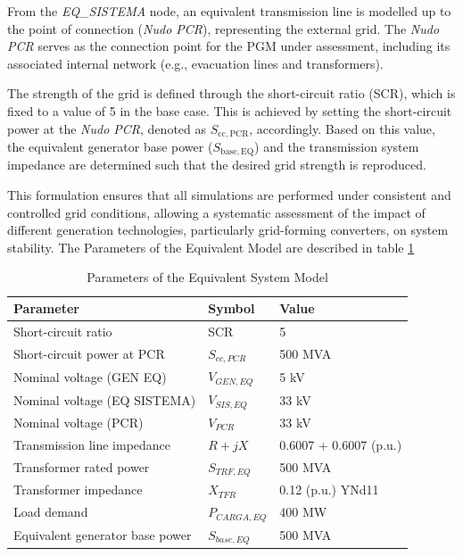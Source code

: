 From the \textit{EQ\_SISTEMA} node, an equivalent transmission line is modelled up to the point of connection (\textit{Nudo PCR}), representing the external grid. The \textit{Nudo PCR} serves as the connection point for the PGM under assessment, including its associated internal network (e.g., evacuation lines and transformers).

The strength of the grid is defined through the short-circuit ratio (SCR), which is fixed to a value of 5 in the base case. This is achieved by setting the short-circuit power at the \textit{Nudo PCR}, denoted as $S_{\mathrm{cc,PCR}}$, accordingly. Based on this value, the equivalent generator base power ($S_{\mathrm{base,EQ}}$) and the transmission system impedance are determined such that the desired grid strength is reproduced.

This formulation ensures that all simulations are performed under consistent and controlled grid conditions, allowing a systematic assessment of the impact of different generation technologies, particularly grid-forming converters, on system stability. The Parameters of the Equivalent Model are described in table \ref{tab:eq_system_parameters}
\begin{table}[htbp!]
    \centering
    \caption{Parameters of the Equivalent System Model}
    \label{tab:eq_system_parameters}
    \begin{tabular}{lll}
    \hline
    \textbf{Parameter} & \textbf{Symbol} & \textbf{Value} \\
    \hline
    Short-circuit ratio & SCR & 5 \\
    Short-circuit power at PCR & $S_{cc,PCR}$ & 500 MVA \\
    Nominal voltage (GEN EQ) & $V_{GEN,EQ}$ & 5 kV \\
    Nominal voltage (EQ SISTEMA) & $V_{SIS,EQ}$ & 33 kV \\
    Nominal voltage (PCR) & $V_{PCR}$ & 33 kV \\
    Transmission line impedance & $R + jX$ & 0.6007 + 0.6007 (p.u.) \\
    Transformer rated power & $S_{TRF,EQ}$ & 500 MVA \\
    Transformer impedance & $X_{TFR}$ & 0.12 (p.u.) YNd11 \\
    Load demand & $P_{CARGA,EQ}$ & 400 MW \\
    Equivalent generator base power & $S_{base,EQ}$ & 500 MVA \\
    \hline
    \end{tabular}
    \end{table}

